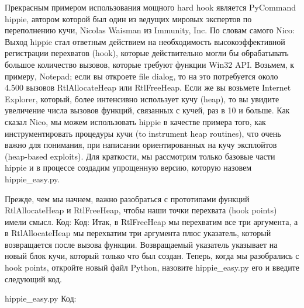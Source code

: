 \documentclass[12pt]{book}
\begin{document}
Прекрасным примером использования мощного hard hook является PyCommand hippie, автором которой был один из ведущих мировых экспертов по переполнению кучи, Nicolas Waisman из Immunity, Inc. По словам самого Nico:
Выход hippie стал ответным действием на необходимость высокоэффективной регистрации перехватов (hook), которые действительно могли бы обрабатывать большое количество вызовов, которые требуют функции Win32 API. Возьмем, к примеру, Notepad; если вы откроете file dialog, то на это потребуется около 4.500 вызовов RtlAllocateHeap или RtlFreeHeap. Если же вы возьмете Internet Explorer, который, более интенсивно использует кучу (heap), то вы увидите увеличение числа вызовов функций, связанных с кучей, раз в 10 и больше.
Как сказал Nico, мы можем использовать hippie в качестве примера того, как инструментировать процедуры кучи (to instrument heap routines), что очень важно для понимания, при написании ориентированных на кучу эксплойтов (heap-based exploits). Для краткости, мы рассмотрим только базовые части hippie и в процессе создадим упрощенную версию, которую назовем hippie\_easy.py.

Прежде, чем мы начнем, важно разобраться с прототипами функций RtlAllocateHeap и RtlFreeHeap, чтобы наши точки перехвата (hook points) имели смысл.
Код:
Код:
Итак, в RtlFreeHeap мы перехватим все три аргумента, а в RtlAllocateHeap мы перехватим три аргумента плюс указатель, который возвращается после вызова функции. Возвращаемый указатель указывает на новый блок кучи, который только что был создан. Теперь, когда мы разобрались с hook points, откройте новый файл Python, назовите hippie\_easy.py его и введите следующий код.

hippie\_easy.py
Код:


        
\end{document}
